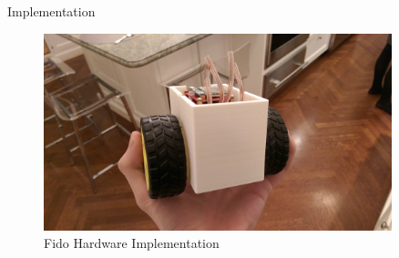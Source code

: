\documentclass[final]{beamer}
\newlength{\sepwid}
\newlength{\onecolwid}
\newlength{\twocolwid}
\begin{document}
\begin{frame}[t]
\begin{columns}[t]
\begin{column}{\onecolwid}
\begin{block}{Implementation}
		\begin{figure}
			\centering
			\includegraphics[width=.77\linewidth]{Figures/Prototype.jpg}
			\caption{Fido Hardware Implementation}
		\end{figure}
	\end{block}


\end{column}

\begin{column}{\sepwid}\end{column}

\begin{column}{\twocolwid}


\end{column}
\end{columns}
\end{frame}
\end{document}

